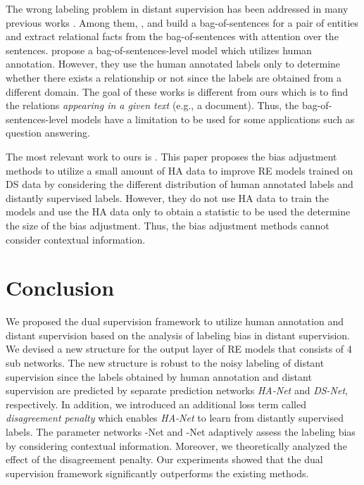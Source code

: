 \documentclass[11pt]{article}
\newcommand{\hanet}{\emph{HA-Net}\xspace}
\newcommand{\dsnet}{\emph{DS-Net}\xspace}
\newcommand{\munet}{-Net\xspace}
\newcommand{\sigmanet}{-Net\xspace}
\begin{document}
The wrong labeling problem in distant supervision has been addressed in many previous works \cite{zeng2015distant,lin2016neural,ye2019distant,beltagy2018combining}.
Among them, ,  and  
build a bag-of-sentences for a pair of entities and extract relational facts from the bag-of-sentences with attention over the sentences.
 propose a bag-of-sentences-level model which utilizes human annotation.
However, they use the human annotated labels only to determine whether there exists a relationship or not since the labels are obtained from a different domain.
The goal of these works is different from ours which is to find the relations \emph{appearing in a given text} (e.g., a document). 
Thus, the bag-of-sentences-level models have a limitation to be used for some applications such as question answering.





The most relevant work to ours is \cite{ye2019looking}.
This paper proposes the bias adjustment methods to utilize a small amount of HA data to improve RE models trained on DS data 
by considering the different distribution of human annotated labels and distantly supervised labels.
However, they do not use HA data to train the models and use the HA data only to obtain a statistic to be used the determine the size of the bias adjustment.
Thus, the bias adjustment methods cannot consider contextual information.





 \section{Conclusion}
We proposed the dual supervision framework to utilize human annotation and distant supervision based on the analysis of labeling bias in distant supervision.
We devised a new structure for the output layer of RE models that consists of 4 sub networks.
The new structure is robust to the noisy labeling of distant supervision since the labels obtained by human annotation and distant supervision are predicted by separate prediction networks \hanet and \dsnet, respectively.
In addition, we introduced an additional loss term called \emph{disagreement penalty} which enables \hanet  to learn from distantly supervised labels.
The parameter networks \munet and \sigmanet adaptively assess the labeling bias by considering contextual information.
Moreover, we theoretically analyzed the effect of the disagreement penalty.
Our experiments showed that the dual supervision framework significantly outperforms the existing methods.
 



\end{document}
